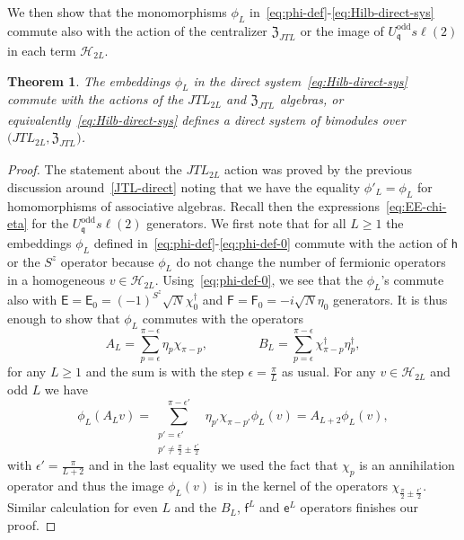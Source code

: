\documentclass[11pt]{article}
\newcommand{\q}{\mathfrak{q}}
\newcommand{\JTL}[1]{JTL_{#1}}
\newcommand{\LQGodd}{U^{\text{odd}}_{\q} s\ell(2)}
\newcommand{\F}{\mathsf{F}}
\newcommand{\FF}[1]{\F_{#1}}
\newcommand{\f}{\mathsf{f}}
\newcommand{\E}{\mathsf{E}}
\newcommand{\EE}[1]{\E_{#1}}
\newcommand{\h}{\mathsf{h}}
\newcommand{\e}{\mathsf{e}}
\newcommand{\Hilb}{\mathcal{H}}
\newcommand{\step}{\epsilon}
\newcommand{\cent}{\mathfrak{Z}}
\newcommand{\centJTL}{\cent_{\JTL{}}}
\newtheorem{Thm}[subsection]{Theorem}
\theoremstyle{definition}
\begin{document}
 We then show that the monomorphisms $\phi_L$ in~\eqref{eq:phi-def}-\eqref{eq:Hilb-direct-sys} commute also with the action of the centralizer $\centJTL$ or the image of $\LQGodd$ in each term $\Hilb_{2L}$.

\begin{Thm}\label{thm:phi}
The embeddings $\phi_L$ in the direct system~\eqref{eq:Hilb-direct-sys} commute with the actions of the $\JTL{2L}$ and $\centJTL$ algebras, or equivalently~\eqref{eq:Hilb-direct-sys} defines a direct system of bimodules over $\bigl(\JTL{2L},\centJTL\bigr)$.
\end{Thm}
\begin{proof}
The statement about the $\JTL{2L}$ action was proved by the previous discussion around~\eqref{JTL-direct} noting that we have the equality $\phi'_L=\phi_L$ for homomorphisms of associative algebras.
Recall then the expressions~\eqref{eq:EE-chi-eta} for the $\LQGodd$ generators. We first note that for all $L\geq1$ the embeddings $\phi_L$ defined in~\eqref{eq:phi-def}-\eqref{eq:phi-def-0} commute with the action of $\h$ or the $S^z$ operator because $\phi_L$ do not change the number of fermionic operators in a homogeneous $v\in\Hilb_{2L}$. Using~\eqref{eq:phi-def-0}, we see that the $\phi_L$'s commute also with $\E=\EE 0=(-1)^{S^z}\sqrt{N}\chi_0^{\dagger}$ and $\F=\FF 0=-i\sqrt{N}\eta_0$ generators.
It is thus enough to show that $\phi_L$ commutes with the operators
\begin{equation*}
A_L=\sum_{p=\step}^{\pi-\step}\eta_p\chi_{\pi-p},\qquad\qquad
B_L=\sum_{p=\step}^{\pi-\step}
\chi^{\dagger}_{\pi-p}\eta^{\dagger}_p,
\end{equation*}
for any $L\geq1$ and the sum is with the step $\step=\frac{\pi}{L}$ as usual. For any $v\in\Hilb_{2L}$ and odd $L$ we have
\begin{equation*}
\phi_L(A_L v) = \sum_{\substack{p'=\step'\\p'\ne\frac{\pi}{2}\pm\frac{\step'}{2}}}^{\pi-\step'}\eta_{p'}\chi_{\pi-p'} \phi_L(v) = A_{L+2}\phi_L(v),
\end{equation*}
with $\step'=\frac{\pi}{L+2}$ and in the last equality we used the fact that $\chi_p$ is an annihilation operator and thus the image $\phi_L(v)$ is in the kernel of the operators $\chi_{\frac{\pi}{2}\pm\frac{\step'}{2}}$. Similar calculation for even $L$ and the $B_L$, $\f^L$ and $\e^L$ operators finishes our proof.
\end{proof}
\end{document}
